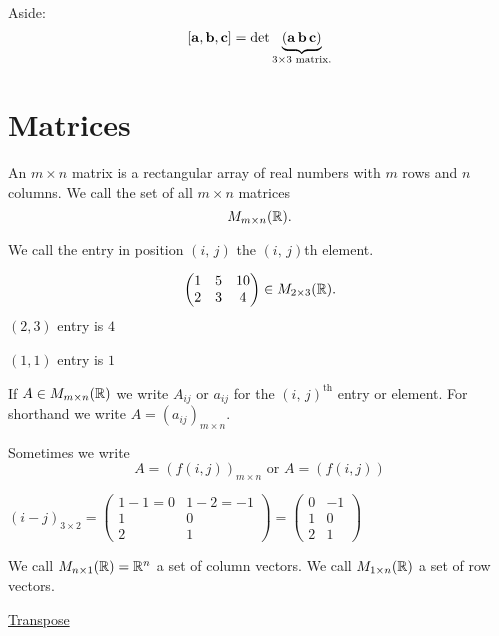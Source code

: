 \documentclass[10pt, a4paper]{article}
\begin{document}
Aside:
\[
[\mathbf{a}, \mathbf{b}, \mathbf{c}] = \det\underbrace{\left(\mathbf{a}\, \mathbf{b}\, \mathbf{c}\right)}_{3 \times 3 \text{ matrix}.}
\]

\newpage

\section{Matrices}

\begin{definition}
    An $m \times n$ matrix is a rectangular array of real numbers with $m$ rows and $n$ columns. We call the set of all $m \times n$ matrices
    \[
    M_{m \times n}(\mathbb{R}).
    \]
\end{definition}

We call the entry in position $(i,\,j)$ the $(i,\,j)$th element.

\begin{example}
    \[
    \begin{pmatrix}
        1 & 5 & 10 \\
        2 & 3 & 4
    \end{pmatrix} \in M_{2 \times 3}(\mathbb{R}).
    \]
    $(2, 3)$ entry is $4$

    $(1, 1)$ entry is $1$
\end{example}

If $A \in M_{m \times n}(\mathbb{R})$ we write $A_{ij}$ or $a_{ij}$ for the $(i,\,j)^{\text{th}}$ entry or element. For shorthand we write $A = (a_{ij})_{m \times n}$.

Sometimes we write
\[
A = (f(i, j))_{m \times n} \text{ or } A = (f(i, j))
\]

\begin{example}
    $(i - j)_{3 \times 2} = \begin{pmatrix}
        1 - 1 = 0 & 1 - 2 = -1 \\
        1 & 0 \\
        2 & 1
    \end{pmatrix}
    =
    \begin{pmatrix}
        0 & -1 \\
        1 & 0 \\
        2 & 1
    \end{pmatrix}$
\end{example}

We call $M_{n \times 1}(\mathbb{R}) = \mathbb{R} ^ n$ a set of column vectors. We call $M_{1 \times n}(\mathbb{R})$ a set of row vectors.

\underline{Transpose}
\end{document}

